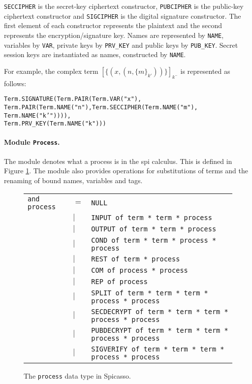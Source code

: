 \documentclass[10pt,a4paper,final,oneside,fleqn]{book}
\begin{document}
\noindent
\texttt{SECCIPHER} is the secret-key ciphertext constructor, \texttt{PUBCIPHER} is the public-key ciphertext constructor and \texttt{SIGCIPHER} is the digital signature constructor.  The first element of each constructor represents the plaintext and the second represents the encryption/signature key.  Names are represented by \texttt{NAME}, variables by \texttt{VAR}, private keys by \texttt{PRV\_KEY} and public keys by \texttt{PUB\_KEY}.  Secret session keys are instantiated as names, constructed by \texttt{NAME}.

For example, the complex term $[\!\{(x,(n,\{m\}_{k'}))\}\!]_{k^-}$ is represented as follows:\vspace{6mm}

\noindent
\texttt{Term.SIGNATURE(Term.PAIR(Term.VAR("x"),}\\
\texttt{Term.PAIR(Term.NAME("n"),Term.SECCIPHER(Term.NAME("m"), Term.NAME("k'")))),}\\\texttt{Term.PRV\_KEY(Term.NAME("k")))}

\paragraph{Module \texttt{Process}.} The module denotes what a process is in the spi calculus.  This is defined in Figure \ref{processtype2}.  The module also provides operations for substitutions of terms and the renaming of bound names, variables and tags.
\begin{figure}[bht]
\begin{center}
\begin{tabular}{|lll|}
\hline
\texttt{and process}&$=$&\texttt{NULL}\\
&$\mid$&\texttt{INPUT of term * term * process}\\
&$\mid$&\texttt{OUTPUT of term * term * process}\\
&$\mid$&\texttt{COND of term * term * process * process}\\
&$\mid$&\texttt{REST of term * process}\\
&$\mid$&\texttt{COM of process * process}\\
&$\mid$&\texttt{REP of process}\\
&$\mid$&\texttt{SPLIT of term * term * term * process * process}\\
&$\mid$&\texttt{SECDECRYPT of term * term * term * process * process}\\
&$\mid$&\texttt{PUBDECRYPT of term * term * term * process * process}\\
&$\mid$&\texttt{SIGVERIFY of term * term * term * process * process}\\
\hline
\end{tabular}
\end{center}
\caption{The \texttt{process} data type in Spicasso.\label{processtype2}}
\end{figure}
\end{document}
